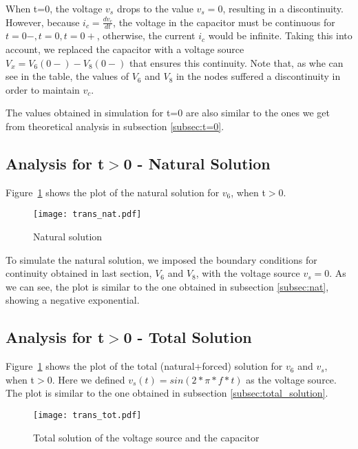 When t=0, the voltage $v_s$ drops to the value $v_s=0$, resulting in a discontinuity. However, because $i_c=\frac{dv_c}{dt}$, the voltage in the capacitor must be continuous for $t=0-, t=0, t=0+$, otherwise, the current $i_c$ would be infinite. Taking this into account, we replaced the capacitor with a voltage source $V_x=V_6(0-)-V_8(0-)$ that ensures this continuity. Note that, as whe can see in the table, the values of $V_6$ and $V_8$ in the nodes suffered a discontinuity in order to maintain $v_c$. 

The values obtained in simulation for t=0 are also similar to the ones we get from theoretical analysis in subsection \ref{subsec:t=0}.

\newpage
\subsection{Analysis for t$>$0 - Natural Solution}

\par Figure~\ref{fig:trans_nat} shows the plot of the natural solution for $v_6$, when t$>$0.

\begin{figure}[H] \centering
\texttt{[image: trans\_nat.pdf]}
\caption{Natural solution}
\label{fig:trans_nat}
\end{figure}

To simulate the natural solution, we imposed the boundary conditions for continuity obtained in last section, $V_6$ and $V_8$, with the voltage source $v_s=0$. As we can see, the plot is similar to the one obtained in subsection \ref{subsec:nat}, showing a negative exponential.

\newpage
\subsection{Analysis for t$>$0 - Total Solution}

\par Figure~\ref{fig:trans_nat} shows the plot of the total (natural+forced) solution for $v_6$ and $v_s$, when t$>$0. Here we defined $v_s(t)=sin(2*\pi*f*t)$ as the voltage source. The plot is similar to the one obtained in subsection \ref{subsec:total_solution}.

\begin{figure}[H] \centering
\texttt{[image: trans\_tot.pdf]}
\caption{Total solution of the voltage source and the capacitor}
\label{fig:trans_tot}
\end{figure}

